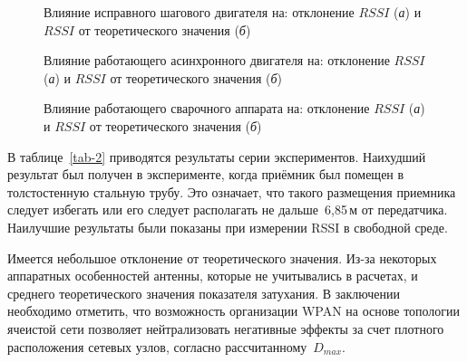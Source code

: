 \begin{figure} [htb]
	\caption[Влияние исправного шагового двигателя на: отклонение $RSSI$ и $RSSI$ от теоретического значения]
	{Влияние исправного шагового двигателя на: отклонение $RSSI$ (\textit{а}) и $RSSI$ от теоретического значения (\textit{б})}
	\label{ch-3/fig-8}
\end{figure}

\begin{figure} [htb]
	\caption[Влияние работающего асинхронного двигателя на: отклонение $RSSI$ и $RSSI$ от теоретического значения]
	{Влияние работающего асинхронного двигателя на: отклонение $RSSI$ (\textit{а}) и $RSSI$ от теоретического значения (\textit{б})}
	\label{ch-3/fig-9}
\end{figure}

\begin{figure} [htb]
	\caption[Влияние работающего сварочного аппарата на: отклонение $RSSI$ и $RSSI$ от теоретического значения]
	{Влияние работающего сварочного аппарата на: отклонение $RSSI$ (\textit{а}) и $RSSI$ от теоретического значения (\textit{б})}
	\label{ch-3/fig-10}
\end{figure}

В таблице~\cref{tab-2} приводятся результаты серии экспериментов. Наихудший результат был получен в эксперименте, когда приёмник был помещен в толстостенную стальную трубу. Это означает, что такого размещения приемника следует избегать или его следует располагать не дальше~6,85\,м от передатчика. Наилучшие результаты были показаны при измерении RSSI в свободной среде.

\noindent Имеется небольшое отклонение от теоретического значения. Из-за некоторых аппаратных особенностей антенны, которые не учитывались в расчетах, и среднего теоретического значения показателя затухания. В заключении необходимо отметить, что возможность организации WPAN на основе топологии ячеистой сети позволяет нейтрализовать негативные эффекты за счет плотного расположения сетевых узлов, согласно рассчитанному~$D_{max}$.


